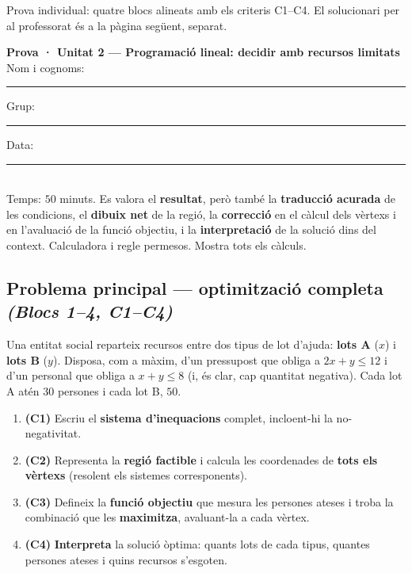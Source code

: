 %
{Prova individual: quatre blocs alineats amb els criteris C1–C4. El solucionari per al professorat és a la pàgina següent, separat.}

\begin{tcolorbox}[colback=white, colframe=udnavy, boxrule=0.8pt, arc=2pt,
  left=8pt, right=8pt, top=6pt, bottom=6pt]
\textbf{Prova · Unitat 2 — Programació lineal: decidir amb recursos limitats}\\[4pt]
Nom i cognoms: \rule{6.5cm}{0.4pt} \quad Grup: \rule{1.6cm}{0.4pt} \quad Data: \rule{2.2cm}{0.4pt}\\[6pt]
\small Temps: $50$ minuts. Es valora el \textbf{resultat}, però també la
\textbf{traducció acurada} de les condicions, el \textbf{dibuix net} de la regió, la
\textbf{correcció} en el càlcul dels vèrtexs i en l'avaluació de la funció objectiu, i
la \textbf{interpretació} de la solució dins del context. Calculadora i regle
permesos. Mostra tots els càlculs.
\end{tcolorbox}

\vspace{0.4em}

\subsection*{Problema principal — optimització completa \hfill \normalfont\itshape (Blocs 1--4, C1--C4)}

\noindent Una entitat social reparteix recursos entre dos tipus de lot d'ajuda:
\textbf{lots A} ($x$) i \textbf{lots B} ($y$). Disposa, com a màxim, d'un pressupost
que obliga a $2x+y\le 12$ i d'un personal que obliga a $x+y\le 8$ (i, és clar, cap
quantitat negativa). Cada lot A atén $30$ persones i cada lot B, $50$.

\begin{enumerate}[label=\textbf{\arabic*.}, leftmargin=2em, itemsep=7pt]
  \item \textbf{(C1)} Escriu el \textbf{sistema d'inequacions} complet, incloent-hi la
        no-negativitat.
  \item \textbf{(C2)} Representa la \textbf{regió factible} i calcula les coordenades de
        \textbf{tots els vèrtexs} (resolent els sistemes corresponents).
  \item \textbf{(C3)} Defineix la \textbf{funció objectiu} que mesura les persones
        ateses i troba la combinació que les \textbf{maximitza}, avaluant-la a cada
        vèrtex.
  \item \textbf{(C4)} \textbf{Interpreta} la solució òptima: quants lots de cada tipus,
        quantes persones ateses i quins recursos s'esgoten.
\end{enumerate}

